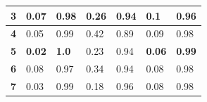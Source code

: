 \begin{table}[h!]
\begin{tabular}{|l|l|l|l|l|l|l|}
\textbf{3}                                                         & 0.07                                                                      & 0.98                                                                       & 0.26                                                                   & 0.94                                                                    & 0.1                                                                & 0.96                                                                \\ \hline
\textbf{4}                                                         & 0.05                                                                      & 0.99                                                                       & 0.42                                                                   & 0.89                                                                    & 0.09                                                               & 0.98                                                                \\ \hline
\textbf{5}                                                         & \textbf{0.02}                                                             & \textbf{1.0}                                                               & 0.23                                                                   & 0.94                                                                    & \textbf{0.06}                                                      & \textbf{0.99}                                                       \\ \hline
\textbf{6}                                                         & 0.08                                                                      & 0.97                                                                       & 0.34                                                                   & 0.94                                                                    & 0.08                                                               & 0.98                                                                \\ \hline
\textbf{7}                                                         & 0.03                                                                      & 0.99                                                                       & 0.18                                                                   & 0.96                                                                    & 0.08                                                               & 0.98                                                                \\ \hline

\end{tabular}
\end{table}
